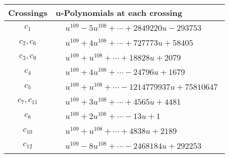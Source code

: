 \documentclass[1p]{elsarticle_modified}
\theoremstyle{definition}
\begin{document}
\begin{tabular}{m{50pt}|m{274pt}}
Crossings & \hspace{64pt}u-Polynomials at each crossing \\
\hline $$\begin{aligned}c_{1}\end{aligned}$$&$\begin{aligned}
&u^{109}-5 u^{108}+\cdots+2849220 u-293753
\end{aligned}$\\
\hline $$\begin{aligned}c_{2},c_{6}\end{aligned}$$&$\begin{aligned}
&u^{109}+4 u^{108}+\cdots+727773 u+58405
\end{aligned}$\\
\hline $$\begin{aligned}c_{3},c_{9}\end{aligned}$$&$\begin{aligned}
&u^{109}+u^{108}+\cdots+18828 u+2079
\end{aligned}$\\
\hline $$\begin{aligned}c_{4}\end{aligned}$$&$\begin{aligned}
&u^{109}+4 u^{108}+\cdots-24796 u+1679
\end{aligned}$\\
\hline $$\begin{aligned}c_{5}\end{aligned}$$&$\begin{aligned}
&u^{109}+u^{108}+\cdots-1214779937 u+75810647
\end{aligned}$\\
\hline $$\begin{aligned}c_{7},c_{11}\end{aligned}$$&$\begin{aligned}
&u^{109}+3 u^{108}+\cdots+4565 u+4481
\end{aligned}$\\
\hline $$\begin{aligned}c_{8}\end{aligned}$$&$\begin{aligned}
&u^{109}+2 u^{108}+\cdots-13 u+1
\end{aligned}$\\
\hline $$\begin{aligned}c_{10}\end{aligned}$$&$\begin{aligned}
&u^{109}+u^{108}+\cdots+4838 u+2189
\end{aligned}$\\
\hline $$\begin{aligned}c_{12}\end{aligned}$$&$\begin{aligned}
&u^{109}-8 u^{108}+\cdots-2468184 u+292253
\end{aligned}$\\
\hline
\end{tabular}\\~\\
\end{document}
